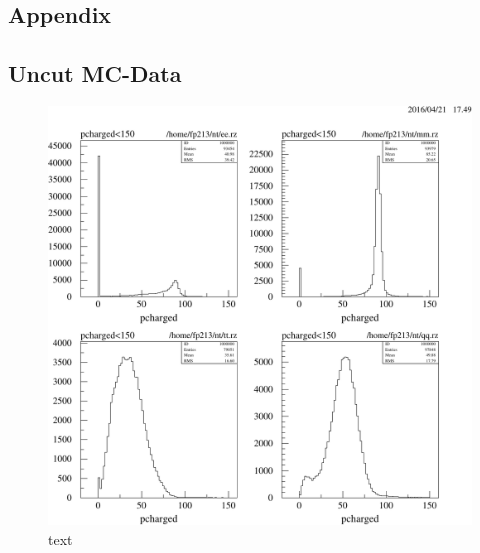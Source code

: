 \documentclass[11pt, a4paper]{article}
\numberwithin{equation}{section}
\begin{document}
\begin{appendix}
\newpage
\section{Appendix}

\subsection{Uncut MC-Data}
\label{app:uncut_mc}

\begin{figure}[h]
	\centering
	\includegraphics[width=1\textwidth]{./data/tag2/uncut/cropped/pcharged_uncut.pdf}
	\caption{text}
\end{figure}


\end{appendix}
\end{document}
